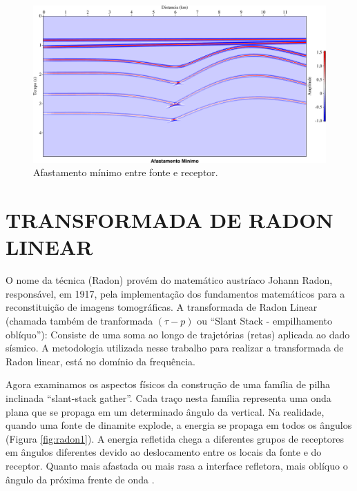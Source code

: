 \begin{landscape}
\begin{figure}[H]
\centering
\includegraphics[totalheight=14cm]{figuras/cap2/seis_minoffset.pdf}
\caption{Afastamento mínimo entre fonte e receptor.}
\label{fig:afastamento_min}
\end{figure}
\end{landscape}

\section{TRANSFORMADA DE RADON LINEAR}

O nome da técnica (Radon) provém do matemático austríaco Johann Radon, responsável, em 1917, pela implementação dos fundamentos matemáticos para a reconstituição de imagens tomográficas. A transformada de Radon Linear (chamada também de tranformada $(\tau -p)$ ou ``Slant Stack - empilhamento oblíquo''): Consiste de uma soma ao longo de trajetórias (retas) aplicada ao dado sísmico. A metodologia utilizada nesse trabalho para realizar a transformada de Radon linear, está no domínio da frequência.

Agora examinamos os aspectos físicos da construção de uma família de pilha inclinada ``slant-stack gather''. Cada traço nesta família representa uma onda plana que se propaga em um determinado ângulo da vertical. Na realidade, quando uma fonte de dinamite explode, a energia se propaga em todos os ângulos (Figura \ref{fig:radon1}). A energia refletida chega a diferentes grupos de receptores em ângulos diferentes devido ao deslocamento entre os locais da fonte e do receptor. Quanto mais afastada ou mais rasa a interface refletora, mais oblíquo o ângulo da próxima frente de onda \citep{Yilmaz(2000)}.

